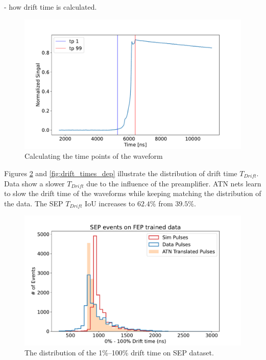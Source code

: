 - how drift time is calculated.


\begin{figure}[!htb]
    \centering
    \includegraphics[width=0.99\linewidth]{ch8/figs/time_calc.pdf}
    \caption{Calculating the time points of the waveform}
    \label{fig:ch8:time_calc}
\end{figure}


 Figures \ref{fig:drift_times_sep} and \ref{fig:drift_times_dep} illustrate the distribution of drift time $T_{Drift}$. Data show a slower $T_{Drift}$ due to the influence of the preamplifier. ATN nets learn to slow the drift time of the waveforms while keeping matching the distribution of the data.  The SEP $T_{Drift}$ IoU increases to $62.4\%$ from $39.5\%$.
 
\begin{figure}[!htb]
\centering
\includegraphics[width=0.99\linewidth,trim={0pc 0pc 0pc 0pc},clip]{ch8/figs/sep_drift_time.pdf}
\caption{The distribution of the 1\%–100\% drift time on SEP dataset.}
\label{fig:drift_times_sep}
\end{figure}

